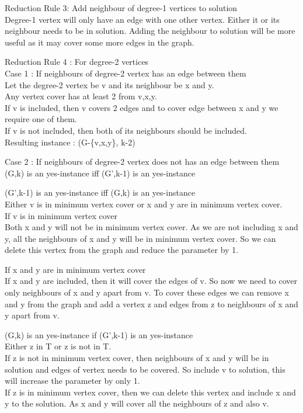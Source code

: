 Reduction Rule 3: Add neighbour of degree-1 vertices to solution \\
Degree-1 vertex will only have an edge with one other vertex. Either it or its neighbour needs to be in
solution. Adding the neighbour to solution will be more useful as it may cover some more edges in the
graph.

Reduction Rule 4 : For degree-2 vertices \\
Case 1 : If neighbours of degree-2 vertex has an edge between them \\
Let the degree-2 vertex be v and its neighbour be x and y. \\
Any vertex cover has at least 2 from {v,x,y}. \\
If v is included, then v covers 2 edges and to cover edge between x and y we require one of them. \\
If v is not included, then both of its neighbours should be included. \\
Resulting instance : (G-\{v,x,y\}, k-2) 

Case 2 : If neighbours of degree-2 vertex does not has an edge between them \\
(G,k) is an yes-instance iff (G',k-1) is an yes-instance

(G',k-1) is an yes-instance iff (G,k) is an yes-instance \\
Either v is in minimum vertex cover or x and y are in minimum vertex cover. \\
If v is in minimum vertex cover \\
Both x and y will not be in minimum vertex cover. As we are not including x and y,
all the neighbours of x and y will be in minimum vertex cover. So we can delete this vertex
from the graph and reduce the parameter by 1.

If x and y are in minimum vertex cover \\
If x and y are included, then it will cover the edges of v. So now we need to cover only neighbours
of x and y apart from v. To cover these edges we can remove x and y from the graph and add a vertex 
z and edges from z to neighbours of x and y apart from v.  

(G,k) is an yes-instance if (G’,k-1) is an yes-instance \\
Either z in T or z is not in T. \\
If z is not in minimum vertex cover, then neighbours of x and y will be in solution and edges of vertex 
needs to be covered. So include v to solution, this will increase the parameter by only 1. \\
If z is in minimum vertex cover, then we can delete this vertex and include x and y to the solution.
As x and y will cover all the neighbours of z and also v.\\

